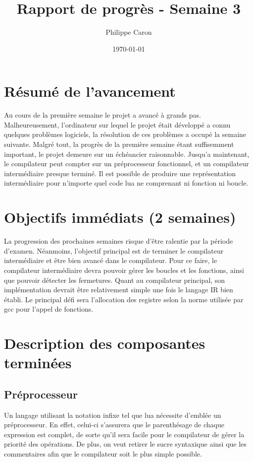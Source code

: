 \documentclass{article}
\title{Rapport de progrès - Semaine 3}
\date{\today}
\author{Philippe Caron}
\begin{document}
\maketitle
\section{Résumé de l'avancement}
Au cours de la première semaine le projet a avancé à grands pas. Malheureusement, l'ordinateur sur lequel le projet était développé a connu quelques problèmes logiciels, la résolution de ces problèmes a occupé la semaine suivante. Malgré tout, la progrès de la première semaine étant suffisemment important, le projet demeure sur un échéancier raisonnable. Jusqu'a maintenant, le compilateur peut compter sur un préprocesseur fonctionnel, et un compilateur intermédiaire presque terminé. Il est possible de produire une représentation intermédiaire pour n'importe quel code lua ne comprenant ni fonction ni boucle.

\section{Objectifs immédiats (2 semaines)}
La progression des prochaines semaines risque d'être ralentie par la période d'examen. Néanmoins, l'objectif principal est de terminer le compilateur intermédiaire et être bien avancé dans le compilateur. Pour ce faire, le compilateur intermédiaire devra pouvoir gérer les boucles et les fonctions, ainsi que pouvoir détecter les fermetures. Quant au compilateur principal, son implémentation devrait être relativement simple une fois le langage IR bien établi. Le principal défi sera l'allocation des registre selon la norme utilisée par gcc pour l'appel de fonctions.

\section{Description des composantes terminées}
\subsection{Préprocesseur}
Un langage utilisant la notation infixe tel que lua nécessite d'emblée un préprocesseur. En effet, celui-ci s'assurera que le parenthésage de chaque expression est complet, de sorte qu'il sera facile pour le compilateur de gérer la priorité des opérations. De plus, on veut retirer le sucre syntaxique ainsi que les commentaires afin que le compilateur soit le plus simple possible.
\end{document}
